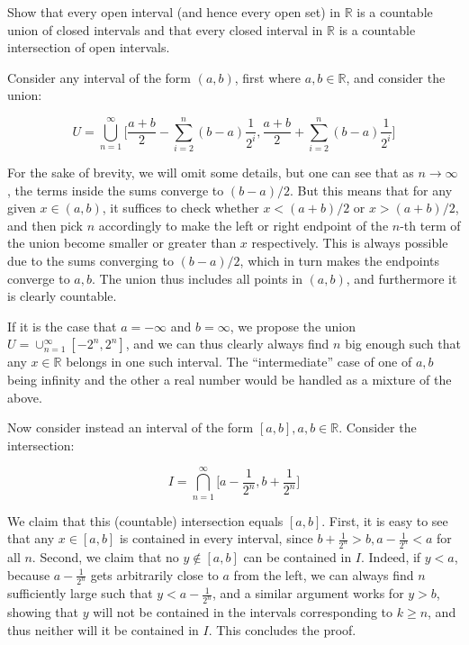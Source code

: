 \begin{exercise}{8}
    Show that every open interval (and hence every open set) in $\mathbb{R}$ is a countable union of closed intervals and that every closed interval in $\mathbb{R}$ is a countable intersection of open intervals.
\end{exercise}

\begin{solution}
    
    Consider any interval of the form $(a, b)$, first where $a, b \in \mathbb{R}$, and consider the union:

    $$U = \bigcup_{n=1}^{\infty} \Biggl[\frac{a+b}{2} - \sum_{i=2}^{n}(b-a)\frac{1}{2^i}, \frac{a+b}{2} + \sum_{i=2}^{n}(b-a)\frac{1}{2^i} \Biggr]$$

    For the sake of brevity, we will omit some details, but one can see that as $n \rightarrow \infty$, the terms inside the sums converge to $(b-a)/2$.
    But this means that for any given $x \in (a, b)$, it suffices to check whether $x < (a+b)/2$ or $x > (a+b)/2$, and then pick $n$ accordingly to make the left or right endpoint of the $n$-th term of the union become smaller or greater than $x$ respectively.
    This is always possible due to the sums converging to $(b-a)/2$, which in turn makes the endpoints converge to $a, b$.
    The union thus includes all points in $(a, b)$, and furthermore it is clearly countable.

    If it is the case that $a = -\infty$ and $b = \infty$, we propose the union $U = \cup_{n=1}^{\infty} [-2^n, 2^n]$, and we can thus clearly always find $n$ big enough such that any $x \in \mathbb{R}$ belongs in one such interval.
    The ``intermediate'' case of one of $a, b$ being infinity and the other a real number would be handled as a mixture of the above.

    Now consider instead an interval of the form $[a, b], a, b \in \mathbb{R}$.
    Consider the intersection:

    $$I = \bigcap_{n=1}^{\infty} \Biggl[ a - \frac{1}{2^n}, b + \frac{1}{2^n}\Biggr]$$

    We claim that this (countable) intersection equals $[a, b]$.
    First, it is easy to see that any $x \in [a,b]$ is contained in every interval, since $b + \frac{1}{2^n} > b, a - \frac{1}{2^n} < a$ for all $n$.
    Second, we claim that no $y \notin [a, b]$ can be contained in $I$.
    Indeed, if $y < a$, because $a - \frac{1}{2^n}$ gets arbitrarily close to $a$ from the left, we can always find $n$ sufficiently large such that $y < a - \frac{1}{2^n}$, and a similar argument works for $ y > b$, showing that $y$ will not be contained in the intervals corresponding to $k \geq n$, and thus neither will it be contained in $I$.
    This concludes the proof.
\end{solution}

